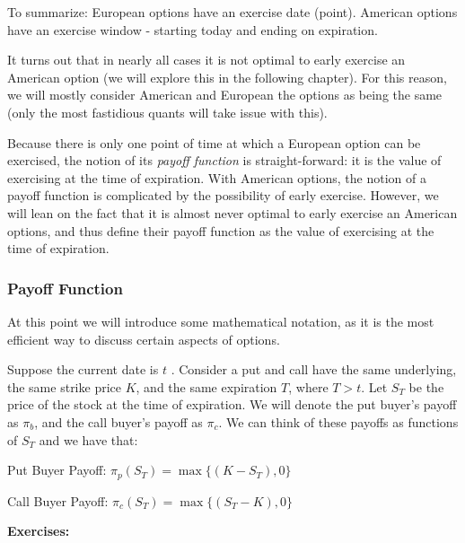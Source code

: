 \documentclass[11pt,]{krantz}
\begin{document}
To summarize: European options have an exercise date (point). American options have an exercise window - starting today and ending on expiration.

It turns out that in nearly all cases it is not optimal to early exercise an American option (we will explore this in the following chapter). For this reason, we will mostly consider American and European the options as being the same (only the most fastidious quants will take issue with this).

Because there is only one point of time at which a European option can be exercised, the notion of its \emph{payoff function} is straight-forward: it is the value of exercising at the time of expiration. With American options, the notion of a payoff function is complicated by the possibility of early exercise. However, we will lean on the fact that it is almost never optimal to early exercise an American options, and thus define their payoff function as the value of exercising at the time of expiration.

\subsubsection*{Payoff Function}\label{payoff-function}

At this point we will introduce some mathematical notation, as it is the most efficient way to discuss certain aspects of options.

Suppose the current date is \(t\) . Consider a put and call have the same underlying, the same strike price \(K\), and the same expiration \(T\), where \(T > t\). Let \(S_{T}\) be the price of the stock at the time of expiration. We will denote the put buyer's payoff as \(\pi_{b}\), and the call buyer's payoff as \(\pi_{c}\). We can think of these payoffs as functions of \(S_{T}\) and we have that:

Put Buyer Payoff: \(\pi_{p}(S_{T}) = \max \big \{(K - S_{T}),0 \big \}\)

Call Buyer Payoff: \(\pi_{c}(S_{T}) = \max \big \{(S_{T} - K), 0 \big \}\)

\textbf{Exercises:}
\end{document}
